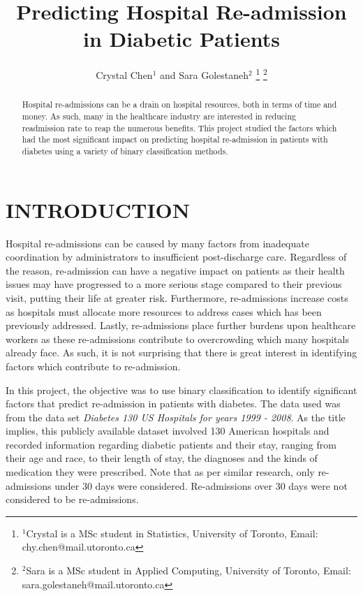 \documentclass[letterpaper, 10 pt, conference]{ieeeconf}  %
\title{\LARGE \bf
Predicting Hospital Re-admission in Diabetic Patients 
}
\author{Crystal Chen$^{1}$ and Sara Golestaneh$^{2}$%
\thanks{$^{1}$Crystal is a MSc student in Statistics, 
University of Toronto, 
Email: chy.chen@mail.utoronto.ca}%
\thanks{$^{2}$Sara is a MSc student in Applied Computing, 
University of Toronto,
Email: sara.golestaneh@mail.utoronto.ca}%
}
\begin{document}
\maketitle
\thispagestyle{empty}
\pagestyle{empty}


\begin{abstract}

Hospital re-admissions can be a drain on hospital resources, both in terms of time and money. As such, many in the healthcare industry are interested in reducing readmission rate to reap the numerous benefits. This project studied the factors which had the most significant impact on predicting hospital re-admission in patients with diabetes using a variety of binary classification methods. 

\end{abstract}

\section{INTRODUCTION}

Hospital re-admissions can be caused by many factors from inadequate coordination by administrators\cite{medpac2007} to insufficient post-discharge care\cite{heartfailure}. Regardless of the reason, re-admission can have a negative impact on patients as their health issues may have progressed to a more serious stage compared to their previous visit, putting their life at greater risk. Furthermore, re-admissions increase costs as hospitals must allocate more resources to address cases which has been previously addressed. Lastly, re-admissions place further burdens upon healthcare workers as these re-admissions contribute to overcrowding which many hospitals already face. As such, it is not surprising that there is great interest in identifying factors which contribute to re-admission. 

In this project, the objective was to use binary classification to identify significant factors that predict re-admission in patients with diabetes. The data used was from the data set \textit{Diabetes 130 US Hospitals for years 1999 - 2008}. As the title implies, this publicly available dataset involved 130 American hospitals and recorded information regarding diabetic patients and their stay, ranging from their age and race, to their length of stay, the diagnoses and the kinds of medication they were prescribed. Note that as per similar research, only re-admissions under 30 days were considered\cite{survey}. Re-admissions over 30 days were not considered to be re-admissions.
\end{document}
